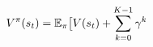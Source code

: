 \documentclass[preview]{standalone}
\begin{document}
\begin{align*}
\special{dvisvgm:raw <g id='unique000'>}V^{\pi}(s_t) = \mathbb{E}_{\pi} \big[ V(s_t) + \sum_{k=0}^{K-1} \gamma^k \,\special{dvisvgm:raw </g>}
\end{align*}
\end{document}
